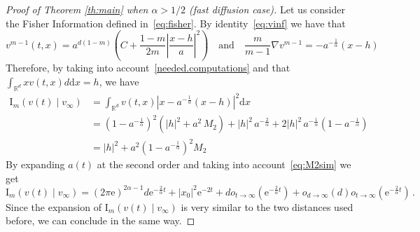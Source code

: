 \documentclass[10pt,reqno]{amsart}
\numberwithin{equation}{section}
\begin{document}
\begin{proof}[Proof of Theorem \ref{th:main} when $\alpha>1/2$ (fast diffusion case)]
Let us consider the Fisher Information defined in~\eqref{eq:fisher}. By identity~\eqref{eq:vinf} we have that
\begin{equation*}
    v^{m-1}(t,x)=a^{d(1-m)}\left(C+\frac{1-m}{2m}\left|\frac{x-h}{a}\right|^2\right)\quad\mbox{and}\quad \frac{m}{m-1}\nabla v^{m-1} =-a^{-\frac{1}{\alpha}}\left(x-h\right)
\end{equation*}
Therefore, by taking into account~\eqref{needed.computations} and that $\int_{\mathbb{R}^d} x v(t,x) d\mathrm{d}x = h$, we have
\begin{equation*}
    \begin{split}
         \mathrm{I}_m(v(t)\mid v_\infty) & =\int_{\mathbb{R}^d}v(t,x) \left|x-a^{-\frac{1}{\alpha}}(x-h)\right|^2 \mathrm{d}x 
          \\ & = (1-a^{-\frac{1}{\alpha}})^2\left(|h|^2 + a^2\, M_2\right) + |h|^2\,a^{-\frac{2}{\alpha}} +2 |h|^2\,a^{-\frac{1}{\alpha}} (1-a^{-\frac{1}{\alpha}})  \\
          & = |h|^2 + a^2 (1-a^{-\frac{1}{\alpha}})^2 M_2
    \end{split}
\end{equation*}
 By expanding $a(t)$ at the second order and taking into account~\eqref{eq:M2sim} we get
 \begin{equation*}
      \mathrm{I}_m(v(t)\mid v_\infty) = (2\pi\mathrm{e})^{2\alpha-1}d \mathrm{e}^{-\frac{2}{\alpha}t} + |x_0|^2 \mathrm{e}^{-2t} +  do_{t\rightarrow\infty}(\mathrm{e}^{-\frac{2}{\alpha}t}) + o_{d\rightarrow\infty}(d)o_{t\rightarrow\infty}(\mathrm{e}^{-\frac{2}{\alpha}t})\,.
 \end{equation*}
Since the expansion of $\mathrm{I}_m(v(t)\mid v_\infty)$ is very similar to the two distances used before, we can conclude in the same way. 
\end{proof}
\end{document}
